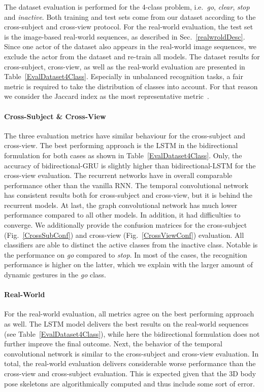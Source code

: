 \documentclass[letterpaper, 10 pt, conference]{ieeeconf}
\begin{document}
The dataset evaluation is  performed for the 4-class problem, i.e.~\emph{go}, \emph{clear}, \emph{stop} and \emph{inactive}. Both training and test sets come from our dataset according to the cross-subject and cross-view protocol. For the real-world evaluation, the test set is the image-based real-world sequences, as described in Sec.~\ref{realwroldDesc}. Since one actor of the dataset also appears in the real-world image sequences, we exclude the actor from the dataset and re-train all models. The dataset results for cross-subject, cross-view, as well as the real-world evaluation are presented in Table~\ref{EvalDataset4Class}. Especially in unbalanced recognition tasks, a fair metric is required to take the distribution of classes into account. For that reason we consider the Jaccard index as the most representative metric~\cite{Escalera2015ChalearnResults}.

\paragraph{Cross-Subject \& Cross-View} The three evaluation metrics have similar behaviour for the cross-subject and cross-view. The best performing approach is the LSTM in the bidirectional formulation for both cases as shown in Table~\ref{EvalDataset4Class}. Only, the accuracy of bidirectional-GRU is slightly higher than bidirectional-LSTM for the cross-view evaluation. The recurrent networks have in overall comparable performance other than the vanilla RNN. The temporal convolutional network has consistent results both for cross-subject and cross-view, but it is behind the recurrent models. At last, the graph convolutional network has much lower performance compared to all other models. In addition, it had difficulties to converge. We additionally provide the confusion matrices for the cross-subject (Fig.~\ref{CrossSubConf}) and cross-view (Fig.~\ref{CrossViewConf}) evaluation. All classifiers are able to distinct the active classes from the inactive class. Notable is the performance on \emph{go} compared to \emph{stop}. In most of the cases, the recognition performance is higher on the latter, which we explain with the larger amount of dynamic gestures in the \emph{go} class.

\paragraph{Real-World} For the real-world evaluation, all metrics agree on the best performing approach as well. The LSTM model delivers the best results on the real-world sequences (see Table~\ref{EvalDataset4Class}), while here the bidirectional formulation does not further improve the final outcome. Next, the behavior of the temporal convolutional network is similar to the cross-subject and cross-view evaluation. In total, the real-world evaluation delivers considerable worse performance than the cross-view and cross-subject evaluation. This is expected given that the 3D body pose skeletons are algorithmically computed and thus include some sort of error.
\end{document}
